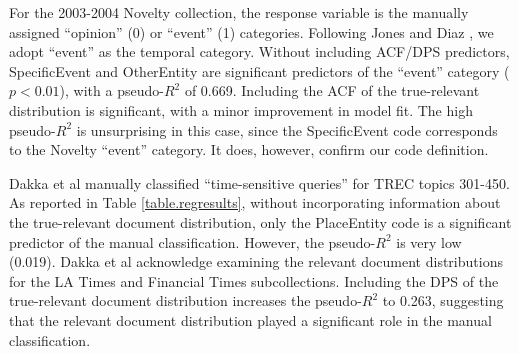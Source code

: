 \documentclass{asist}
\begin{document}
\begin{table}
\small
{}
\caption{Logistic regression models for each test collection without and with (Rel) ACF/DPS predictors. Model fit reported based pseudo-$R^2$ after stepwise variable selection based on AIC. Variable significance indicated by $p < 0.05 (^\circ),  < 0.01 (^\vartriangle),  < 0.001 (^\blacktriangle)$ }
\label{table.regresults}
\end{table}

For the 2003-2004 Novelty collection, the response variable is the manually assigned ``opinion'' (0) or ``event'' (1) categories.  Following Jones and Diaz \cite{Jones2007}, we adopt ``event'' as the temporal category.   Without including ACF/DPS predictors, SpecificEvent and OtherEntity are significant predictors of the ``event'' category ($p < 0.01$), with a pseudo-$R^2$ of 0.669. Including the ACF of the true-relevant distribution is significant, with a minor improvement in model fit. The high pseudo-$R^2$ is unsurprising in this case, since the SpecificEvent code corresponds to the Novelty ``event'' category. It does, however, confirm our code definition.

Dakka et al \cite{Dakka2012} manually classified ``time-sensitive queries'' for TREC topics 301-450. As reported in Table \ref{table.regresults}, without incorporating information about the true-relevant document distribution, only the PlaceEntity code is a significant predictor of the manual classification. However, the pseudo-$R^2$ is very low (0.019).  Dakka et al acknowledge examining the relevant document distributions for the LA Times and Financial Times subcollections.  Including the DPS of the true-relevant document distribution increases the pseudo-$R^2$ to 0.263, suggesting that the relevant document distribution played a significant role in the manual classification.
\end{document}
